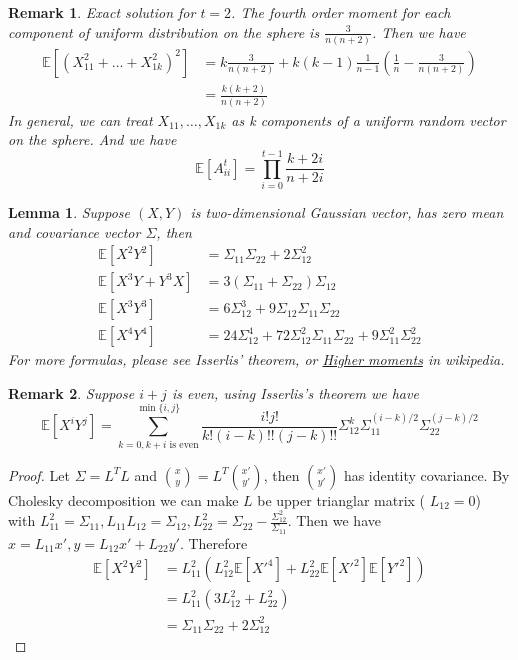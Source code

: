 \documentclass{article}
\def\E{\mathbb{E}}
\newtheorem{lemma}{Lemma}
\newtheorem{remark}{Remark}
\begin{document}
\begin{remark}
Exact solution for $t=2$. The fourth order moment for each component of uniform distribution on the sphere is $\frac{3}{n(n+2)}$. Then we have
\begin{align*}
\E[(X_{11}^2 + \dots + X_{1k}^2)^2] &= k\frac{3}{n(n+2)} + k(k-1)\frac{1}{n-1} (\frac{1}{n} - \frac{3}{n(n+2)}) \\
&=\frac{k(k+2)}{n(n+2)}
\end{align*}
In general, we can treat $X_{11}, \dots, X_{1k}$ as k components of a uniform random vector on the sphere. And we have 
\begin{equation}
\E[A_{ii}^t] = \prod_{i=0}^{t-1}\frac{k+2i}{n+2i}
\end{equation}
\end{remark}
\begin{lemma}\label{lem:x2y2}
Suppose $(X,Y)$ is two-dimensional Gaussian vector, has zero mean and covariance vector $\Sigma$, then 
\begin{align*}
\E[X^2 Y^2] &= \Sigma_{11}\Sigma_{22} + 2\Sigma_{12}^2 \\
\E[X^3 Y + Y^3 X ] &= 3 (\Sigma_{11} + \Sigma_{22}) \Sigma_{12} \\
\E[X^3 Y^3] & = 6 \Sigma_{12}^3 + 9 \Sigma_{12} \Sigma_{11} \Sigma_{22}\\
\E[X^4 Y^4] & = 24 \Sigma_{12}^4 + 72 \Sigma_{12}^2 \Sigma_{11} \Sigma_{22} + 9\Sigma_{11}^2 \Sigma_{22}^2
\end{align*}
For more formulas, please see Isserlis' theorem, or \href{https://en.wikipedia.org/wiki/Multivariate_normal_distribution#Higher_moments}{Higher moments} in wikipedia.
\end{lemma}
\begin{remark}
Suppose $ i + j $ is even, using Isserlis's theorem we have
\begin{equation}
\E[X^i Y^j] = \sum_{k=0, k+i \textrm{ is even}}^{\min\{i,j\}}\frac{i! j!}{k! (i-k)!!(j-k)!!} \Sigma_{12}^k \Sigma_{11}^{(i-k)/2}\Sigma_{22}^{(j-k)/2}
\end{equation}
\end{remark}
\begin{proof}
Let $\Sigma = L^T L $ and $\binom{x}{y} = L^T \binom{x'}{y'}$, then $\binom{x'}{y'}$ has identity covariance. By Cholesky decomposition we can make $L$ be upper trianglar matrix (
$L_{12}=0$) with $L_{11}^2 = \Sigma_{11}, L_{11}L_{12} = \Sigma_{12}, L_{22}^2 = \Sigma_{22} - \frac{\Sigma_{12}^2}{\Sigma_{11}}$. Then we have $x = L_{11} x', y = L_{12} x' + L_{22} y'$. Therefore
\begin{align*}
\E[X^2 Y^2] & = L_{11}^2 (L_{12}^2\E[X'^4]+ L^2_{22}\E[X'^2]\E[Y'^2]) \\
& = L_{11}^2(3L_{12}^2 + L^2_{22}) \\
& = \Sigma_{11}\Sigma_{22} + 2\Sigma_{12}^2
\end{align*}
\end{proof}
\end{document}
